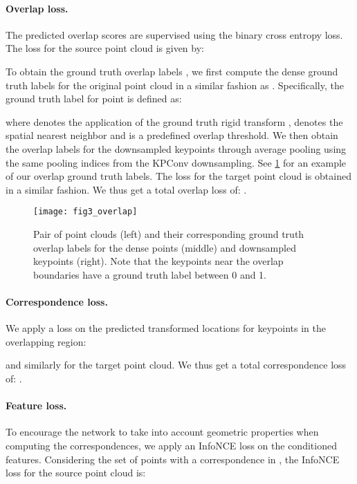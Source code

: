 \documentclass[10pt,twocolumn,letterpaper]{article}
\begin{document}
\vspace{-4mm}
\paragraph{Overlap loss.} The predicted overlap scores are supervised using the binary cross entropy loss. The loss for the source point cloud  is given by:

To obtain the ground truth overlap labels , we first compute the dense ground truth labels for the original point cloud in a similar fashion as \cite{huang2021predator}.
Specifically, the ground truth label for point  is defined as:

where  denotes the application of the ground truth rigid transform ,  denotes the spatial nearest neighbor and  is a predefined overlap threshold. 
We then obtain the overlap labels  for the downsampled keypoints through average pooling using the same pooling indices from the KPConv downsampling. 
See \cref{fig:overlap-labels} for an example of our overlap ground truth labels.
The loss  for the target point cloud  is obtained in a similar fashion. We thus get a total overlap loss of: .

\begin{figure}[t]
    \centering
    \texttt{[image: fig3\_overlap]}
    \caption{Pair of point clouds (left) and their corresponding ground truth overlap labels for the dense points (middle) and downsampled keypoints (right). Note that the keypoints near the overlap boundaries have a ground truth label between 0 and 1.}
    \label{fig:overlap-labels}
\end{figure}

\vspace{-4mm}
\paragraph{Correspondence loss.} We apply a  loss on the predicted transformed locations for keypoints in the overlapping region:

and similarly for the target point cloud. We thus get a total correspondence loss of: .

\vspace{-4mm}
\paragraph{Feature loss.}
To encourage the network to take into account geometric properties when computing the correspondences, we apply an InfoNCE \cite{oord2018infonce} loss on the conditioned features. Considering the set of points  with a correspondence in , the InfoNCE loss for the source point cloud is:
\end{document}
